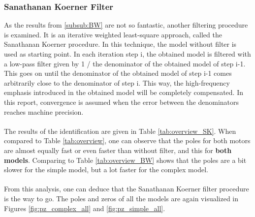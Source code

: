 \documentclass[a4paper,kul]{kulakarticle} %
\begin{document}





\subsubsection{Sanathanan Koerner Filter}

As the results from \ref{subsub:BW} are not so fantastic, another filtering procedure is examined. It is an iterative weighted least-square approach, called the Sanathanan Koerner procedure. In this technique, the model without filter is used as starting point. In each iteration step i, the obtained model is filtered with a low-pass filter given by 1 / the denominator of the obtained model of step i-1. This goes on until the denominator of the obtained model of step i-1 comes arbitrarily close to the denominator of step i. This way, the high-frequency emphasis introduced in the obtained model will be completely compensated. In this report, convergence is assumed when the error between the denominators reaches machine precision.
\\\\
The results of the identification are given in Table \ref{tab:overview_SK}. When compared to Table \ref{tab:overview}, one can observe that the poles for both motors are almost equally fast or even faster than without filter, and this for \textbf{both models}. Comparing to Table \ref{tab:overview_BW} shows that the poles are a bit slower for the simple model, but a lot faster for the complex model.
\\\\
From this analysis, one can deduce that the Sanathanan Koerner filter procedure is the way to go. The poles and zeros of all the models are again visualized in Figures \ref{fig:pz_complex_all} and \ref{fig:pz_simple_all}.
\end{document}
